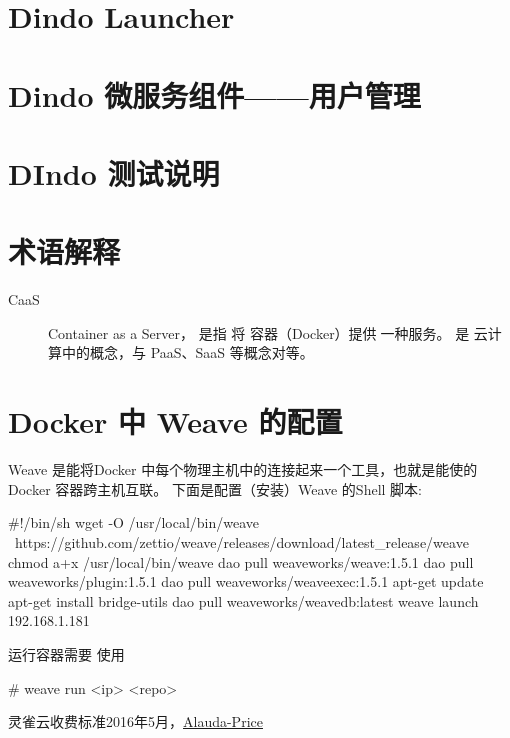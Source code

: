 \documentclass{dingo}
\begin{document}
  \section{Dindo Launcher}

  \section{Dindo 微服务组件——用户管理}

  \section{DIndo 测试说明}

  \newpage
  \begin{appendix}
	  	\section{术语解释}
	  	\label{section:term}
			\begin{description}
				\item[CaaS] Container as a Server， 是指 将 容器（Docker）提供💺一种服务。
					是 云计算中的概念，与 PaaS、SaaS 等概念对等。
			\end{description}

	  	\section{Docker 中 Weave  的配置} %
	  	\label{section:dockerNweave}
	  	Weave 是能将Docker 中每个物理主机中的连接起来一个工具，也就是能使的 Docker 容器跨主机互联。
	  	下面是配置（安装）Weave 的Shell 脚本:
	  	\begin{shell}[caption=Weave 安装]
#!/bin/sh
wget -O /usr/local/bin/weave \
https://github.com/zettio/weave/releases/download/latest_release/weave
chmod a+x /usr/local/bin/weave
dao pull weaveworks/weave:1.5.1
dao pull weaveworks/plugin:1.5.1
dao pull weaveworks/weaveexec:1.5.1
apt-get update
apt-get install bridge-utils
dao pull weaveworks/weavedb:latest
weave launch 192.168.1.181
	  	\end{shell}
	  	运行容器需要 使用
	  	\begin{shell}
# weave run <ip> <repo>
	  	\end{shell}

	  	 \begin{thebibliography}{}
		 灵雀云收费标准2016年5月，\href{http://www.alauda.cn/price/}{Alauda-Price}
	  	 \end{thebibliography}
  \end{appendix}
\end{document}
